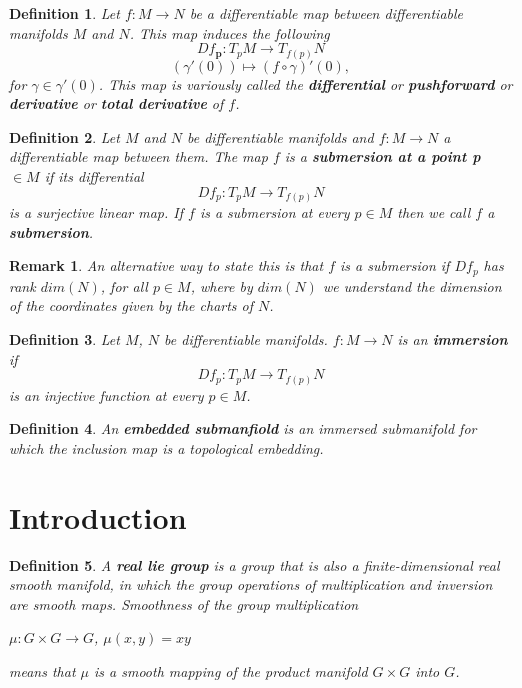 \documentclass[12pt]{article}
\newtheorem{defn}{Definition}[thm]
\newtheorem*{remark}{Remark}
\begin{document}
\begin{defn}
  Let $f: M \to N$ be a differentiable map between differentiable manifolds $M$ and $N$. This map induces the following
  \begin{equation*}
    Df_{\mathbf{p}}: T_pM \to T_{f(p)}N
  \end{equation*}
  \begin{equation*}
    (\gamma'(0)) \mapsto (f \circ \gamma)'(0), 
  \end{equation*}
  for $\gamma \in \gamma'(0)$. This map is variously called the \textbf{differential} or \textbf{pushforward} or \textbf{derivative} or \textbf{total derivative} of $f$. 
\end{defn}
\begin{defn}
  Let $M$ and $N$ be differentiable manifolds and $f: M \to N$ a differentiable map between them. The map $f$ is a \textbf{submersion at a point p} $\in M$ if its differential
  \begin{equation*}
    Df_{p}: T_pM \to T_{f(p)}N
  \end{equation*}
  is a surjective linear map. If  $f$ is a submersion at every $p \in M$ then we call $f$ a \textbf{submersion}.
\end{defn}
\begin{remark}
  An alternative way to state this is that $f$ is a submersion if $Df_{p}$ has rank $dim(N)$, for all $p \in M$, where by $dim(N)$ we understand the dimension of the coordinates given by the charts of $N$.
\end{remark}
\begin{defn}
  Let $M$, $N$ be differentiable manifolds. $f: M \to N$ is an \textbf{immersion} if
  \begin{equation*}
    Df_p : T_pM \to T_{f(p)}N
  \end{equation*}
  is an injective function at every $p \in M$.
\end{defn}
\begin{defn}
  An \textbf{embedded submanfiold} is an immersed submanifold for which the inclusion map is a topological embedding.
\end{defn}
\section{Introduction}

\begin{defn}
  A \textbf{real lie group} is a group that is also a finite-dimensional real smooth manifold, in which the group operations of multiplication and inversion are smooth maps. Smoothness of the group multiplication
\begin{center}
  $\mu : G \times G \to G$,  $\mu(x,y)=xy$
\end{center}
  means that $\mu$ is a smooth mapping of the product manifold $G \times G$ into $G$.
\end{defn}
\end{document}
